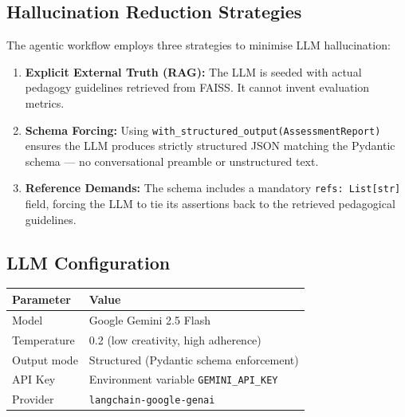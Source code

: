 \documentclass[12pt, a4paper, twoside]{article}
\newcommand{\code}[1]{\texttt{#1}}
\begin{document}
\subsection{Hallucination Reduction Strategies}

The agentic workflow employs three strategies to minimise LLM
hallucination:

\begin{enumerate}[leftmargin=2em]
    \item \textbf{Explicit External Truth (RAG):} The LLM is seeded
          with actual pedagogy guidelines retrieved from FAISS. It
          cannot invent evaluation metrics.

    \item \textbf{Schema Forcing:} Using
          \code{with\_structured\_output(AssessmentReport)} ensures the
          LLM produces strictly structured JSON matching the Pydantic
          schema --- no conversational preamble or unstructured text.

    \item \textbf{Reference Demands:} The schema includes a mandatory
          \code{refs: List[str]} field, forcing the LLM to tie its
          assertions back to the retrieved pedagogical guidelines.
\end{enumerate}

\subsection{LLM Configuration}

\begin{center}
\renewcommand{\arraystretch}{1.3}
\begin{tabular}{ll}
    \toprule
    \textbf{Parameter} & \textbf{Value} \\
    \midrule
    Model              & Google Gemini 2.5 Flash \\
    Temperature        & 0.2 (low creativity, high adherence) \\
    Output mode        & Structured (Pydantic schema enforcement) \\
    API Key            & Environment variable \code{GEMINI\_API\_KEY} \\
    Provider           & \code{langchain-google-genai} \\
    \bottomrule
\end{tabular}
\end{center}

\end{document}
